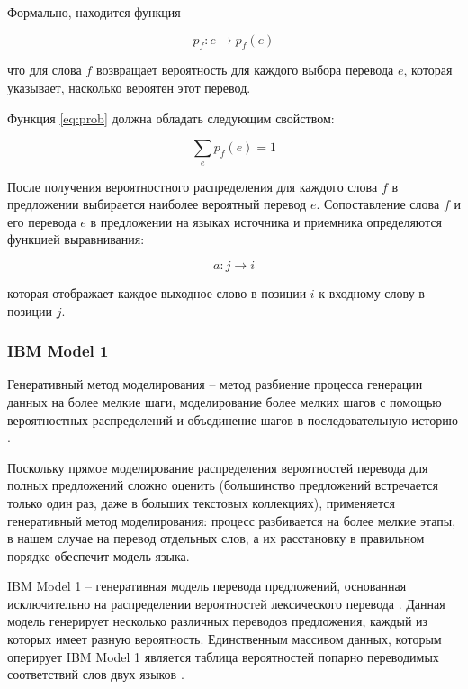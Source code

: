 Формально, находится функция \cite{smt_book}

\begin{equation}
	\label{eq:prob}
	p_f : e \rightarrow p_f(e)
\end{equation}

что для слова $f$ возвращает вероятность для каждого выбора перевода $e$, которая указывает, насколько вероятен этот перевод.

Функция \ref{eq:prob} должна  обладать следующим свойством:

\begin{equation}
	\label{eq:prop1_prob}
	\displaystyle\sum_e p_f(e) = 1
\end{equation}

После получения вероятностного распределения для каждого слова $f$ в предложении выбирается наиболее вероятный перевод $e$. Сопоставление слова $f$ и его перевода $e$ в предложении на языках источника и приемника определяются функцией выравнивания:

\begin{equation}
	\label{eq:alig}
	a : j \rightarrow i
\end{equation}

которая отображает каждое выходное слово в позиции $i$ к входному слову в позиции $j$.

\subsubsection*{IBM Model 1}

Генеративный метод моделирования -- метод разбиение процесса генерации данных на более мелкие шаги, моделирование более мелких шагов с помощью вероятностных распределений и объединение шагов в последовательную историю \cite{smt_book}.

Поскольку прямое моделирование распределения вероятностей перевода для полных предложений сложно оценить (большинство предложений встречается только один раз, даже в больших текстовых коллекциях), применяется генеративный метод моделирования: процесс разбивается на более мелкие этапы, в нашем случае на перевод отдельных слов, а их расстановку в правильном порядке обеспечит модель языка.

IBM Model 1 -- генеративная модель перевода предложений, основанная исключительно на распределении вероятностей лексического перевода \cite{smt_book}. Данная модель генерирует несколько различных переводов предложения, каждый из которых имеет разную вероятность. Единственным массивом данных, которым оперирует IBM Model 1 является таблица вероятностей попарно переводимых соответствий слов двух языков \cite{smt}.

